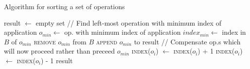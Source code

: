 \begin{algorithm}[!ht]
  \caption{Algorithm for sorting a set of operations}
  \label{alg:opsort}
  \begin{algorithmic}[5]
      \State result $\gets$ empty set
        \State // Find left-most operation with minimum index of application
        \State $o_{min} \gets$ op. with minimum index of application
        \State $index_{min} \gets$ index in $B$ of $o_{min}$
        \State \textsc{remove} $o_{min}$ from $B$
        \State \textsc{append} $o_{min}$ to result
        \Statex
        \State // Compensate op.s which will now proceed rather than
        preceed $o_{min}$
                \State \textsc{index}($o_i$) $\gets$ \textsc{index}($o_i$) + 1
                \State \textsc{index}($o_i$) $\gets$ \textsc{index}($o_i$) - 1
          \EndIf
        \EndFor
       \EndWhile
      \Statex
      \State \Return result
    \EndFunction
  \end{algorithmic}
\end{algorithm}
